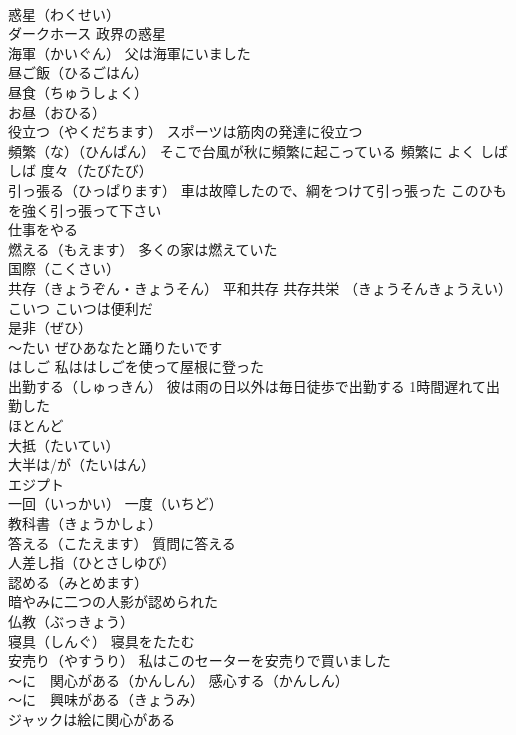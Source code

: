 \documentclass[8pt]{extreport}
\begin{document}
\begin{CJK}{UTF8}{min}
\\	惑星（わくせい） 
\\	ダークホース 政界の惑星
\\	海軍（かいぐん） 父は海軍にいました
\\	昼ご飯（ひるごはん） 
\\	昼食（ちゅうしょく） 
\\	お昼（おひる）
\\	役立つ（やくだちます） スポーツは筋肉の発達に役立つ
\\	頻繁（な）（ひんぱん） そこで台風が秋に頻繁に起こっている 頻繁に よく しばしば 度々（たびたび）
\\	引っ張る（ひっぱります） 車は故障したので、綱をつけて引っ張った このひもを強く引っ張って下さい
\\	仕事をやる
\\	燃える（もえます） 多くの家は燃えていた
\\	国際（こくさい）
\\	共存（きょうぞん・きょうそん） 平和共存 共存共栄 （きょうそんきょうえい）
\\	こいつ こいつは便利だ
\\	是非（ぜひ）　
\\	～たい ぜひあなたと踊りたいです
\\	はしご 私ははしごを使って屋根に登った
\\	出勤する（しゅっきん） 彼は雨の日以外は毎日徒歩で出勤する 1時間遅れて出勤した
\\	ほとんど 
\\	大抵（たいてい）　
\\	大半は/が（たいはん）
\\	エジプト
\\	一回（いっかい） 一度（いちど）
\\	教科書（きょうかしょ）
\\	答える（こたえます） 質問に答える
\\	人差し指（ひとさしゆび）
\\	認める（みとめます） 
\\	暗やみに二つの人影が認められた
\\	仏教（ぶっきょう）
\\	寝具（しんぐ） 寝具をたたむ
\\	安売り（やすうり） 私はこのセーターを安売りで買いました
\\	～に　関心がある（かんしん） 感心する（かんしん）
\\	～に　興味がある（きょうみ）
\\	ジャックは絵に関心がある

\end{CJK}
\end{document}
